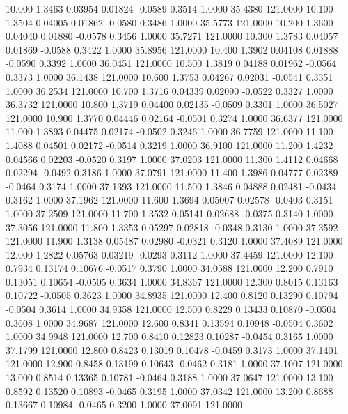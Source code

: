   10.000   1.3463   0.03954   0.01824  -0.0589   0.3514   1.0000  35.4380 121.0000
  10.100   1.3504   0.04005   0.01862  -0.0580   0.3486   1.0000  35.5773 121.0000
  10.200   1.3600   0.04040   0.01880  -0.0578   0.3456   1.0000  35.7271 121.0000
  10.300   1.3783   0.04057   0.01869  -0.0588   0.3422   1.0000  35.8956 121.0000
  10.400   1.3902   0.04108   0.01888  -0.0590   0.3392   1.0000  36.0451 121.0000
  10.500   1.3819   0.04188   0.01962  -0.0564   0.3373   1.0000  36.1438 121.0000
  10.600   1.3753   0.04267   0.02031  -0.0541   0.3351   1.0000  36.2534 121.0000
  10.700   1.3716   0.04339   0.02090  -0.0522   0.3327   1.0000  36.3732 121.0000
  10.800   1.3719   0.04400   0.02135  -0.0509   0.3301   1.0000  36.5027 121.0000
  10.900   1.3770   0.04446   0.02164  -0.0501   0.3274   1.0000  36.6377 121.0000
  11.000   1.3893   0.04475   0.02174  -0.0502   0.3246   1.0000  36.7759 121.0000
  11.100   1.4088   0.04501   0.02172  -0.0514   0.3219   1.0000  36.9100 121.0000
  11.200   1.4232   0.04566   0.02203  -0.0520   0.3197   1.0000  37.0203 121.0000
  11.300   1.4112   0.04668   0.02294  -0.0492   0.3186   1.0000  37.0791 121.0000
  11.400   1.3986   0.04777   0.02389  -0.0464   0.3174   1.0000  37.1393 121.0000
  11.500   1.3846   0.04888   0.02481  -0.0434   0.3162   1.0000  37.1962 121.0000
  11.600   1.3694   0.05007   0.02578  -0.0403   0.3151   1.0000  37.2509 121.0000
  11.700   1.3532   0.05141   0.02688  -0.0375   0.3140   1.0000  37.3056 121.0000
  11.800   1.3353   0.05297   0.02818  -0.0348   0.3130   1.0000  37.3592 121.0000
  11.900   1.3138   0.05487   0.02980  -0.0321   0.3120   1.0000  37.4089 121.0000
  12.000   1.2822   0.05763   0.03219  -0.0293   0.3112   1.0000  37.4459 121.0000
  12.100   0.7934   0.13174   0.10676  -0.0517   0.3790   1.0000  34.0588 121.0000
  12.200   0.7910   0.13051   0.10654  -0.0505   0.3634   1.0000  34.8367 121.0000
  12.300   0.8015   0.13163   0.10722  -0.0505   0.3623   1.0000  34.8935 121.0000
  12.400   0.8120   0.13290   0.10794  -0.0504   0.3614   1.0000  34.9358 121.0000
  12.500   0.8229   0.13433   0.10870  -0.0504   0.3608   1.0000  34.9687 121.0000
  12.600   0.8341   0.13594   0.10948  -0.0504   0.3602   1.0000  34.9948 121.0000
  12.700   0.8410   0.12823   0.10287  -0.0454   0.3165   1.0000  37.1799 121.0000
  12.800   0.8423   0.13019   0.10478  -0.0459   0.3173   1.0000  37.1401 121.0000
  12.900   0.8458   0.13199   0.10643  -0.0462   0.3181   1.0000  37.1007 121.0000
  13.000   0.8514   0.13365   0.10781  -0.0464   0.3188   1.0000  37.0647 121.0000
  13.100   0.8592   0.13520   0.10893  -0.0465   0.3195   1.0000  37.0342 121.0000
  13.200   0.8688   0.13667   0.10984  -0.0465   0.3200   1.0000  37.0091 121.0000
